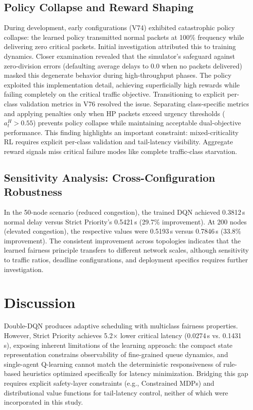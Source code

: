 \documentclass[runningheads,a4paper]{llncs}
\begin{document}
\subsection{Policy Collapse and Reward Shaping}
During development, early configurations (V74) exhibited catastrophic policy collapse: the learned policy transmitted normal packets at 100\% frequency while delivering zero critical packets. Initial investigation attributed this to training dynamics. Closer examination revealed that the simulator's safeguard against zero-division errors (defaulting average delays to 0.0 when no packets delivered) masked this degenerate behavior during high-throughput phases. The policy exploited this implementation detail, achieving superficially high rewards while failing completely on the critical traffic objective. Transitioning to explicit per-class validation metrics in V76 resolved the issue. Separating class-specific metrics and applying penalties only when HP packets exceed urgency thresholds ($a_t^H > 0.55$) prevents policy collapse while maintaining acceptable dual-objective performance. This finding highlights an important constraint: mixed-criticality RL requires explicit per-class validation and tail-latency visibility. Aggregate reward signals miss critical failure modes like complete traffic-class starvation.

\subsection{Sensitivity Analysis: Cross-Configuration Robustness}
In the 50-node scenario (reduced congestion), the trained DQN achieved 0.3812\,s normal delay versus Strict Priority's 0.5421\,s (29.7\% improvement). At 200 nodes (elevated congestion), the respective values were 0.5193\,s versus 0.7846\,s (33.8\% improvement). The consistent improvement across topologies indicates that the learned fairness principle transfers to different network scales, although sensitivity to traffic ratios, deadline configurations, and deployment specifics requires further investigation.

\section{Discussion}
Double-DQN produces adaptive scheduling with multiclass fairness properties. However, Strict Priority achieves 5.2× lower critical latency (0.0274\,s vs. 0.1431\,s), exposing inherent limitations of the learning approach: the compact state representation constrains observability of fine-grained queue dynamics, and single-agent Q-learning cannot match the deterministic responsiveness of rule-based heuristics optimized specifically for latency minimization. Bridging this gap requires explicit safety-layer constraints (e.g., Constrained MDPs) and distributional value functions for tail-latency control, neither of which were incorporated in this study.
\end{document}
